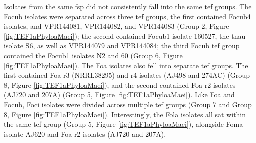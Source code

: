 Isolates from the same \ac{fsp} did not consistently fall into the same \ac{tef} groups. The \ac{Focub} isolates were separated across three \ac{tef} groups, the first 
contained \ac{Focub4} isolates, and VPR144081, VPR144082, and VPR144083 (Group 2, Figure \ref{fig:TEF1aPhyloaMaei}); the second contained \ac{Focub1} isolate 160527, the \ac{tnau} isolate S6, as well as VPR144079 and VPR144084; the third \ac{Focub} \ac{tef} group contained the \ac{Focub1} isolates N2 and 60 (Group 6, Figure \ref{fig:TEF1aPhyloaMaei}). The \ac{Foa} isolates also fell into separate \ac{tef} groups. The first contained \ac{Foa} \ac{r3} (NRRL38295) and \ac{r4} isolates (AJ498 and 274AC) (Group 8, Figure \ref{fig:TEF1aPhyloaMaei}), and the second contained \ac{Foa} \ac{r2} isolates (AJ720 and 207A) (Group 5, Figure \ref{fig:TEF1aPhyloaMaei}). Like \ac{Foa} and \ac{Focub}, \ac{Foci} isolates were divided across multiple \ac{tef} groups (Group 7 and Group 8, Figure \ref{fig:TEF1aPhyloaMaei}). Interestingly, the \ac{Fola} isolates all sat within the same \ac{tef} group (Group 5, Figure \ref{fig:TEF1aPhyloaMaei}), alongside \ac{Foma} isolate AJ620 and \ac{Foa} \ac{r2} isolates (AJ720 and 207A). 

